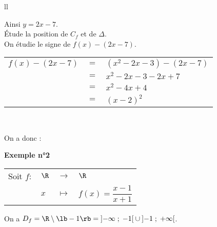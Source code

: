\begin{tabular}{ll}
\begin{minipage}{8cm}
Ainsi $y = 2x -7$.  \\

Étude la position de $C_f$ et de $\Delta$. \\
On étudie le signe de $f(x) - \left(2x-7\right)$. \\

\begin{tabular}{lll}
\hspace*{-.3cm} $f(x) - \left(2x-7\right)$ & $=$ & $\left(x^2 - 2x - 3\right) - \left(2x-7\right)$ \\
& $=$ & $x^2 - 2x - 3 - 2x + 7$ \\
& $=$ & $x^2 - 4x + 4$ \\
& $=$ & $\left(x-2\right)^2$ \\
\end{tabular}


\end{minipage}
\\
\end{tabular}

\vspace*{.5cm}

On a donc : \\


\vspace*{-5cm}

\newpage

\vspace*{-2cm}

\textbf{Exemple n°2} \\

\begin{tabular}{llll}
\hspace*{-.3cm} Soit $f:$ & $\R$ & $\longrightarrow$ & $\R$ \\
& $x$ & $\longmapsto$ & $f(x) = \dfrac{x-1}{x+1}$ \\
\end{tabular}

\vspace*{.3cm}

On a $D_f = \R \setminus \lb -1 \rb = \left]-\infty \; ; \; -1\right[ \cup \left] -1 \; ; \; +\infty \right[$. \\

